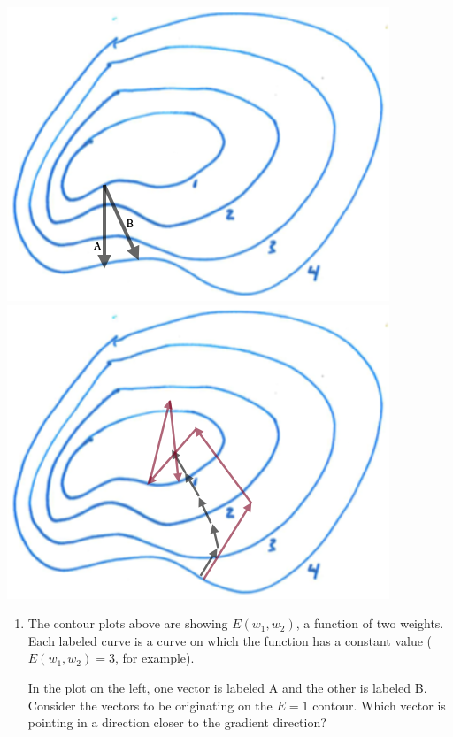 \documentclass[12pt,letterpaper,noanswers]{exam}
\begin{document}
\includegraphics[scale=0.5]{img/C23gradient.png}
\includegraphics[scale=0.5]{img/C23gradientpath.png}
\begin{enumerate}[resume=classQ]
    \item The contour plots above are showing $E(w_1,w_2)$, a function of two weights.  Each labeled curve is a curve on which the function has a constant value ($E(w_1,w_2) = 3$, for example).
   
   In the plot on the left, one vector is labeled A and the other is labeled B.  Consider the vectors to be originating on the $E = 1$ contour.  Which vector is pointing in a direction closer to the gradient direction?
    \vspace{1cm}
   
\end{enumerate}
\end{document}
